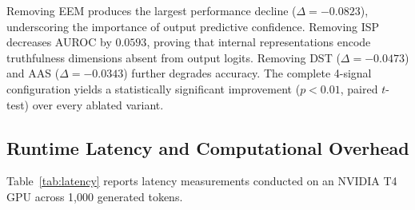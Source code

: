 \documentclass[journal]{IEEEtran}
\begin{document}
Removing EEM produces the largest performance decline ($\Delta = -0.0823$), underscoring the importance of output predictive confidence. Removing ISP decreases AUROC by $0.0593$, proving that internal representations encode truthfulness dimensions absent from output logits. Removing DST ($\Delta = -0.0473$) and AAS ($\Delta = -0.0343$) further degrades accuracy. The complete 4-signal configuration yields a statistically significant improvement ($p < 0.01$, paired $t$-test) over every ablated variant.


\subsection{Runtime Latency and Computational Overhead}
Table~\ref{tab:latency} reports latency measurements conducted on an NVIDIA T4 GPU across 1,000 generated tokens.

\begin{table}[!t]
\caption{Latency Breakdown and Efficiency Comparison}
\label{tab:latency}
\centering
\renewcommand{\arraystretch}{1.1}
\small
{}
\end{table}
\end{document}
